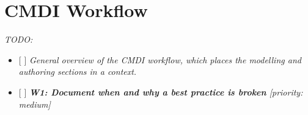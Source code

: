 \section{CMDI Workflow}\label{cmdi-workflow}

\emph{TODO:}

\begin{itemize}
\tightlist
\item
  {[} {]} \emph{General overview of the CMDI workflow, which places the
  modelling and authoring sections in a context.}
\item
  {[} {]} \emph{\textbf{W1: Document when and why a best practice is
  broken} {[}priority: medium{]}}
\end{itemize}
